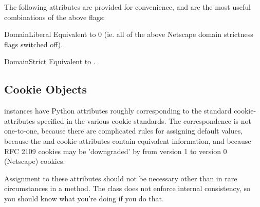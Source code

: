 The following attributes are provided for convenience, and are the
most useful combinations of the above flags:

\begin{memberdesc}[DefaultCookiePolicy]{DomainLiberal}
Equivalent to 0 (ie. all of the above Netscape domain strictness flags
switched off).
\end{memberdesc}
\begin{memberdesc}[DefaultCookiePolicy]{DomainStrict}
Equivalent to .
\end{memberdesc}


\subsection{Cookie Objects \label{cookie-objects}}

 instances have Python attributes roughly corresponding
to the standard cookie-attributes specified in the various cookie
standards.  The correspondence is not one-to-one, because there are
complicated rules for assigning default values, because the
 and  cookie-attributes contain equivalent
information, and because RFC 2109 cookies may be 'downgraded' by
 from version 1 to version 0 (Netscape) cookies.

Assignment to these attributes should not be necessary other than in
rare circumstances in a  method.  The class does
not enforce internal consistency, so you should know what you're
doing if you do that.

